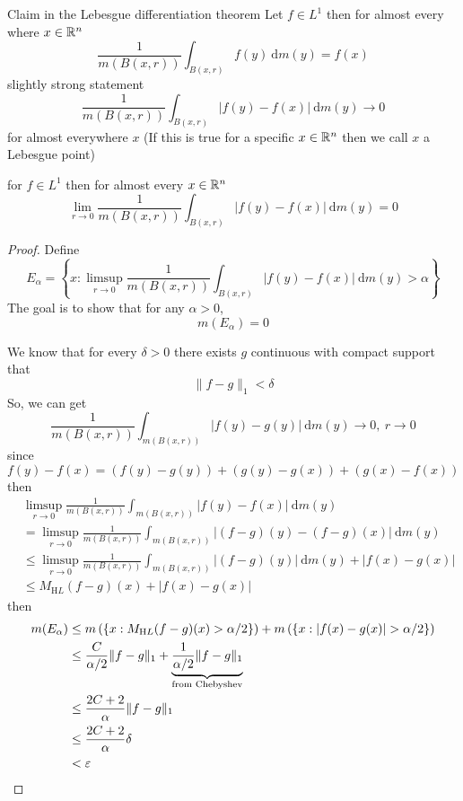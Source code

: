 Claim in the Lebesgue differentiation theorem
Let $f \in L^1$ then for almost every where $x \in \mathbb R^n$ 
\[\frac1{m(B(x, r))}\int_{B(x, r)} f(y) \ \mathrm{d}m(y) = f(x)\]
slightly strong statement
\[\frac1{m(B(x, r))}\int_{B(x, r)} |f(y) - f(x)| \ \mathrm{d}m(y) \to 0\]
for almost everywhere $x$ (If this is true for a specific $x \in \mathbb R^n$ then we call $x$ a Lebesgue point)

\begin{theorem}
  for $f \in L^1$ then for almost every $x \in \mathbb R^n$
  \[\lim_{r \to 0} \frac1{m(B(x, r))}\int_{B(x, r)} |f(y) - f(x)| \ \mathrm{d}m(y) = 0\]
\end{theorem}

\begin{proof}
  Define 
  \[E_\alpha = \left\{x : \limsup_{r \to 0} \frac1{m(B(x, r))}\int_{B(x, r)} |f(y) - f(x)| \ \mathrm{d}m(y) > \alpha\right\}\]
  The goal is to show that for any $\alpha > 0$,
  \[m\left(E_\alpha\right) = 0\]

  We know that for every $\delta > 0$ there exists $g$ continuous with compact support that
  \[\|f-g\|_1 < \delta\]
  So, we can get
  \[\frac{1}{m(B(x, r))}\int_{m(B(x, r))} |f(y) - g(y)| \ \mathrm{d}m(y) \to 0, \ r\to0\]
  since $f(y)-f(x) = (f(y) - g(y)) + (g(y) - g(x)) + (g(x) - f(x))$ then 
  \begin{align*}
    &\limsup_{r\to0} \frac{1}{m(B(x, r))}\int_{m(B(x, r))} |f(y)-f(x)| \ \mathrm{d}m(y) \\
    &=\limsup_{r\to0} \frac{1}{m(B(x, r))}\int_{m(B(x, r))} |(f-g)(y) - (f-g)(x)| \ \mathrm{d}m(y) \\
    &\le \limsup_{r\to0} \frac{1}{m(B(x, r))}\int_{m(B(x, r))} |(f-g)(y)|  \ \mathrm{d}m(y) + |f(x)-g(x)| \\
    &\le M_{\mathrm HL}(f-g)(x) + |f(x) - g(x)| 
  \end{align*}
  then 
  \begin{align*}
    m(E_\alpha) &\le m\left(\left\{x : M_{\mathrm HL}(f-g)(x) > \alpha/2\right\}\right) + m\left(\left\{x : |f(x) - g(x)| > \alpha/2\right\}\right) \\
    &\le \frac{C}{\alpha/2} \|f-g\|_1 + \underbrace{\frac{1}{\alpha/2} \|f-g\|_1}_{\text{from Chebyshev}} \\
    &\le \frac{2C+2}{\alpha} \|f-g\|_1 \\
    &\le \frac{2C+2}{\alpha} \delta \\
    &< \varepsilon
  \end{align*}
\end{proof}

